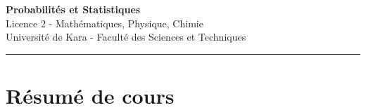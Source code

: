 \documentclass[12pt,a4paper]{article}
\begin{document}
\fi

\begin{center}
  {\LARGE\bfseries Probabilités et Statistiques}\\[6pt]
  {\large Licence 2 - Mathématiques, Physique, Chimie}\\[4pt]
  {\normalsize Université de Kara - Faculté des Sciences et Techniques}
\end{center}

\vspace{8pt}
\hrule
\vspace{12pt}

\section{Résumé de cours}
\end{document}
